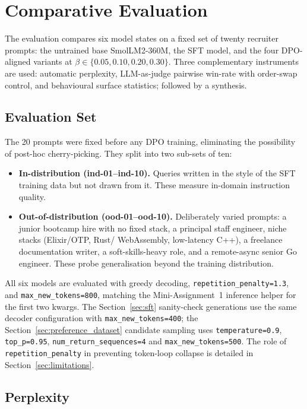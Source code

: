 \documentclass[../main.tex]{subfiles}
\begin{document}
\section{Comparative Evaluation}
\label{sec:evaluation}

The evaluation compares six model states on a fixed set of twenty recruiter prompts: the untrained base SmolLM2-360M, the SFT model, and the four DPO-aligned variants at $\beta \in \{0.05, 0.10, 0.20, 0.30\}$. Three complementary instruments are used: automatic perplexity, LLM-as-judge pairwise win-rate with order-swap control, and behavioural surface statistics; followed by a synthesis.

\subsection{Evaluation Set}
\label{sec:eval_set}

The 20 prompts were fixed before any DPO training, eliminating the possibility of post-hoc cherry-picking. They split into two sub-sets of ten:

\begin{itemize}
  \item \textbf{In-distribution (ind-01--ind-10).} Queries written in the style of the SFT training data but not drawn from it. These measure in-domain instruction quality.
  \item \textbf{Out-of-distribution (ood-01--ood-10).} Deliberately varied prompts: a junior bootcamp hire with no fixed stack, a principal staff engineer, niche stacks (Elixir/OTP, Rust/ WebAssembly, low-latency C++), a freelance documentation writer, a soft-skills-heavy role, and a remote-async senior Go engineer. These probe generalisation beyond the training distribution.
\end{itemize}

All six models are evaluated with greedy decoding, \texttt{repetition\_penalty=1.3}, and \texttt{max\_new\_tokens=800}, matching the Mini-Assignment~1 inference helper for the first two kwargs. The Section~\ref{sec:sft} sanity-check generations use the same decoder configuration with \texttt{max\_new\_tokens=400}; the Section~\ref{sec:preference_dataset} candidate sampling uses \texttt{temperature=0.9}, \texttt{top\_p=0.95}, \texttt{num\_return\_sequences=4} and \texttt{max\_new\_tokens=500}. The role of \texttt{repetition\_penalty} in preventing token-loop collapse is detailed in Section~\ref{sec:limitations}.

\subsection{Perplexity}
\label{sec:eval_perplexity}
\end{document}
